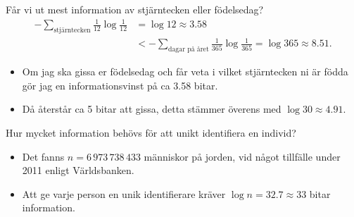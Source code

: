 \documentclass{beamer}
\begin{document}
\begin{frame}
  \begin{example}
    Får vi ut mest information av stjärntecken eller födelsedag?
    \begin{align*}
      -\sum_{\text{stjärntecken}} \frac{1}{12} \log\frac{1}{12} &= \log 12 
      \approx 3.58 \\
      &< -\sum_{\text{dagar på året}} \frac{1}{365} \log\frac{1}{365} = \log 
      365 \approx 8.51.
    \end{align*}
  \end{example}

  \pause{}

  \begin{remark}
    \begin{itemize}
      \item Om jag ska gissa er födelsedag och får veta i vilket stjärntecken 
        ni är födda gör jag en informationsvinst på ca 3.58 bitar.
      \item Då återstår ca 5 bitar att gissa, detta stämmer överens med \(\log 
        30\approx 4.91\).
    \end{itemize}
  \end{remark}
\end{frame}

\begin{frame}
  \begin{exercise}
    Hur mycket information behövs för att unikt identifiera en individ?
  \end{exercise}
\end{frame}

\begin{frame}
  \begin{example}
    \begin{itemize}
      \item Det fanns \(n = 6\,973\,738\,433\) människor på jorden, vid något 
        tillfälle under 2011 enligt Världsbanken.

      \item Att ge varje person en unik identifierare kräver \(\log 
          n = 32.7\approx 33\) bitar information.

    \end{itemize}
  \end{example}
\end{frame}
\end{document}

